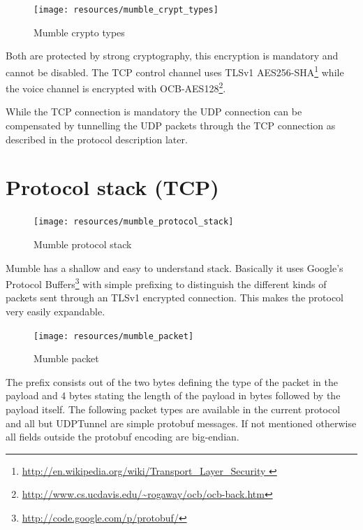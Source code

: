 \documentclass[11pt]{article} %
\begin{document}
\begin{figure}[ht]
	\centering
	\texttt{[image: resources/mumble\_crypt\_types]}
	\caption{Mumble crypto types}
	\label{fig:mumble_crypt_types}
\end{figure}

Both are protected by strong cryptography, this encryption is mandatory and cannot be disabled. The TCP control channel uses TLSv1 AES256-SHA\footnote{\url{http://en.wikipedia.org/wiki/Transport_Layer_Security }} while the voice channel is encrypted with OCB-AES128\footnote{\url{http://www.cs.ucdavis.edu/~rogaway/ocb/ocb-back.htm}}.

While the TCP connection is mandatory the UDP connection can be compensated by tunnelling the UDP packets through the TCP connection as described in the protocol description later.

\section{Protocol stack (TCP)}

\begin{figure}[ht]
	\centering
	\texttt{[image: resources/mumble\_protocol\_stack]}
	\caption{Mumble protocol stack}
	\label{fig:mumble_protocol_stack}
\end{figure}

Mumble has a shallow and easy to understand stack. Basically it uses Google's Protocol Buffers\footnote{\url{http://code.google.com/p/protobuf/}} with simple prefixing to distinguish the different kinds of packets sent through an TLSv1 encrypted connection. This makes the protocol very easily expandable.

\begin{figure}[ht]
	\centering
	\texttt{[image: resources/mumble\_packet]}
	\caption{Mumble packet}
	\label{fig:mumble_packet}
\end{figure}

The prefix consists out of the two bytes defining the type of the packet in the payload and 4 bytes stating the length of the payload in bytes followed by the payload itself. The following packet types are available in the current protocol and all but UDPTunnel are simple protobuf messages. If not mentioned otherwise all fields outside the protobuf encoding are big-endian.
\end{document}
